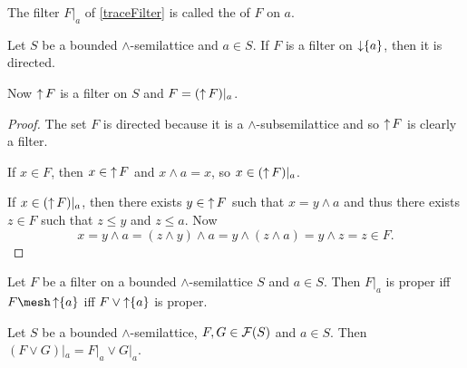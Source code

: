 \begin{definition}
The filter $F|_a$ of \ref{traceFilter} is called the  of $F$ on $a$.
\end{definition}

\begin{lemma}
Let $S$ be a bounded $\wedge$-semilattice and $a\in S$. If $F$ is a filter on $\operatorname{\downarrow} \{a\}$, then it is directed.

Now $\operatorname{\uparrow} F$ is a filter on $S$ and $F = (\operatorname{\uparrow} F)|_a$.
\end{lemma}
\begin{proof}
The set $F$ is directed because it is a $\wedge$-subsemilattice and so $\operatorname{\uparrow} F$ is clearly a filter.

If $x\in F$, then $x\in \operatorname{\uparrow} F$ and $x\wedge a = x$, so $x\in (\operatorname{\uparrow} F)|_a$.

If $x\in (\operatorname{\uparrow} F)|_a$, then there exists $y \in \operatorname{\uparrow} F$ such that $x = y\wedge a$ and thus there exists $z\in F$ such that $z\leq y$ and $z\leq a$. Now
\[ x = y\wedge a = (z\wedge y)\wedge a = y\wedge(z\wedge a) = y\wedge z = z \in F. \]
\end{proof}

\begin{lemma} \label{traceFilterProper}
Let $F$ be a filter on a bounded $\wedge$-semilattice $S$ and $a\in S$. Then $F|_a$ is proper iff $F\mesh\upset\{a\}$ iff $F\vee \operatorname{\uparrow}\{a\}$ is proper.
\end{lemma}

\begin{lemma}
Let $S$ be a bounded $\wedge$-semilattice, $F,G\in\operatorname{\mathcal{F}}(S)$ and $a\in S$. Then $(F\vee G)|_a = F|_a \vee G|_a$.
\end{lemma}


